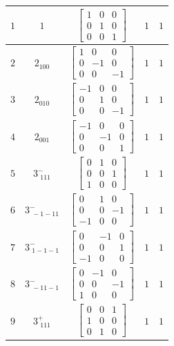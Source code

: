 \documentclass[fleqn,8pt]{jsarticle}
\begin{document}
\begin{longtable}{ccccc}
$ 1 $ & $ 1 $ & $ \begin{bmatrix} 1 & 0 & 0 \\ 0 & 1 & 0 \\ 0 & 0 & 1 \end{bmatrix} $ & $ 1 $ & $ 1 $ \\ \hline
$ 2 $ & $ 2{}_{100} $ & $ \begin{bmatrix} 1 & 0 & 0 \\ 0 & -1 & 0 \\ 0 & 0 & -1 \end{bmatrix} $ & $ 1 $ & $ 1 $ \\ \hline
$ 3 $ & $ 2{}_{010} $ & $ \begin{bmatrix} -1 & 0 & 0 \\ 0 & 1 & 0 \\ 0 & 0 & -1 \end{bmatrix} $ & $ 1 $ & $ 1 $ \\ \hline
$ 4 $ & $ 2{}_{001} $ & $ \begin{bmatrix} -1 & 0 & 0 \\ 0 & -1 & 0 \\ 0 & 0 & 1 \end{bmatrix} $ & $ 1 $ & $ 1 $ \\ \hline
$ 5 $ & $ 3^{-}_{\,\,111} $ & $ \begin{bmatrix} 0 & 1 & 0 \\ 0 & 0 & 1 \\ 1 & 0 & 0 \end{bmatrix} $ & $ 1 $ & $ 1 $ \\ \hline
$ 6 $ & $ 3^{-}_{\,\,-1-11} $ & $ \begin{bmatrix} 0 & 1 & 0 \\ 0 & 0 & -1 \\ -1 & 0 & 0 \end{bmatrix} $ & $ 1 $ & $ 1 $ \\ \hline
$ 7 $ & $ 3^{-}_{\,\,1-1-1} $ & $ \begin{bmatrix} 0 & -1 & 0 \\ 0 & 0 & 1 \\ -1 & 0 & 0 \end{bmatrix} $ & $ 1 $ & $ 1 $ \\ \hline
$ 8 $ & $ 3^{-}_{\,\,-11-1} $ & $ \begin{bmatrix} 0 & -1 & 0 \\ 0 & 0 & -1 \\ 1 & 0 & 0 \end{bmatrix} $ & $ 1 $ & $ 1 $ \\ \hline
$ 9 $ & $ 3^{+}_{\,\,111} $ & $ \begin{bmatrix} 0 & 0 & 1 \\ 1 & 0 & 0 \\ 0 & 1 & 0 \end{bmatrix} $ & $ 1 $ & $ 1 $ \\ \hline

\end{longtable}
\end{document}
